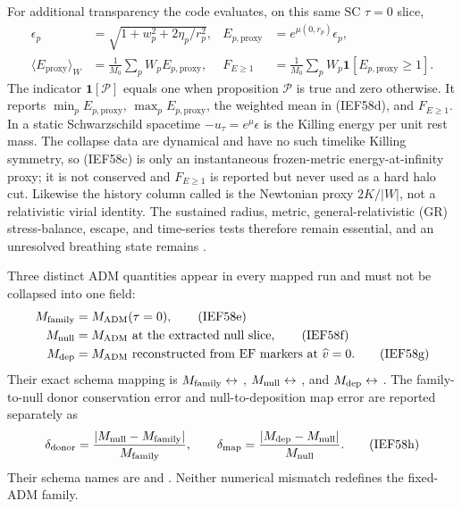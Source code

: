 For additional transparency the code evaluates, on this same SC \(\tau=0\)
slice,
\begin{align}
 \epsilon_p&=\sqrt{1+w_p^2+2\eta_p/r_p^2},
 &E_{p,\mathrm{proxy}}&=e^{\mu(0,r_p)}\epsilon_p,          \tag{IEF58c}\\
 \langle E_{\mathrm{proxy}}\rangle_{W}
 &=\frac{1}{M_0}\sum_pW_pE_{p,\mathrm{proxy}},
 &F_{E\ge1}&=\frac{1}{M_0}\sum_pW_p
       \mathbf 1[E_{p,\mathrm{proxy}}\ge1].              \tag{IEF58d}
\end{align}
The indicator \(\mathbf 1[\mathcal P]\) equals one when proposition
\(\mathcal P\) is true and zero otherwise.
It reports \(\min_pE_{p,\mathrm{proxy}}\),
\(\max_pE_{p,\mathrm{proxy}}\), the weighted mean in (IEF58d), and
\(F_{E\ge1}\).  In a static Schwarzschild spacetime
\(-u_\tau=e^\mu\epsilon\) is the Killing energy per unit rest mass.  The
collapse data are dynamical and have no such timelike Killing symmetry, so
(IEF58c) is only an instantaneous frozen-metric energy-at-infinity proxy; it
is not conserved and \(F_{E\ge1}\) is reported but never used as a hard halo
cut.  Likewise the history column called  is the Newtonian
proxy \(2K/|W|\), not a relativistic virial identity.  The sustained radius,
metric, general-relativistic (GR) stress-balance, escape, and time-series
tests therefore remain
essential, and an unresolved breathing state remains .

Three distinct ADM quantities appear in every mapped run and must not be
collapsed into one field:
\begin{align}
 M_{\rm family}&=M_{\rm ADM}(\tau=0),                    \tag{IEF58e}\\
 M_{\rm null}&=M_{\rm ADM}\text{ at the extracted null slice},\tag{IEF58f}\\
 M_{\rm dep}&=M_{\rm ADM}\text{ reconstructed from EF markers at }\widehat v=0.
                                                               \tag{IEF58g}
\end{align}
Their exact schema mapping is \(M_{\rm family}\leftrightarrow\)
, \(M_{\rm null}\leftrightarrow\)
, and \(M_{\rm dep}\leftrightarrow\)
.
The family-to-null donor conservation error and null-to-deposition map error
are reported separately as
\begin{equation*}
 \delta_{\rm donor}=\frac{|M_{\rm null}-M_{\rm family}|}{M_{\rm family}},
 \qquad
 \delta_{\rm map}=\frac{|M_{\rm dep}-M_{\rm null}|}{M_{\rm null}}.\tag{IEF58h}
\end{equation*}
Their schema names are
 and
.
Neither numerical mismatch redefines the fixed-ADM family.

